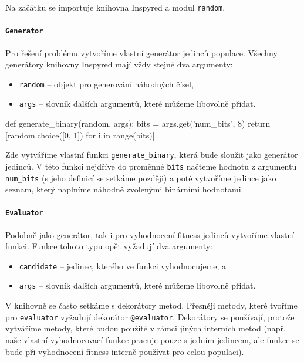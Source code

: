 Na začátku se importuje knihovna Inspyred a modul \texttt{random}.

\paragraph{\texttt{Generator}}
Pro řešení problému vytvoříme vlastní generátor jedinců populace. Všechny
generátory knihovny Inspyred mají vždy stejné dva argumenty:
\begin{itemize}
    \item \texttt{random} -- objekt pro generování náhodných čísel,
    \item \texttt{args} -- slovník dalších argumentů, které můžeme libovolně
        přidat.
\end{itemize}

\begin{code}
def generate_binary(random, args):
    bits = args.get('num_bits', 8)
    return [random.choice([0, 1]) for i in range(bits)]
\end{code}

Zde vytváříme vlastní funkci \texttt{generate\_binary}, která bude sloužit jako
generátor jedinců. V této funkci nejdříve do proměnné \texttt{bits} načteme
hodnotu z argumentu \texttt{num\_bits} (s jeho definicí se setkáme později) a
poté vytvoříme jedince jako seznam, který naplníme náhodně zvolenými binárními
hodnotami.

\paragraph{\texttt{Evaluator}}
Podobně jako generátor, tak i pro vyhodnocení fitness jedinců vytvoříme vlastní
funkci. Funkce tohoto typu opět vyžadují dva argumenty:
\begin{itemize}
    \item \texttt{candidate} -- jedinec, kterého ve funkci vyhodnocujeme, a
    \item \texttt{args} -- slovník dalších argumentů, které můžeme libovolně
        přidat.
\end{itemize}

V knihovně se často setkáme s dekorátory metod. Přesněji metody, které tvoříme
pro \texttt{evaluator} vyžadují dekorátor \texttt{@evaluator}. Dekorátory se
používají, protože vytváříme metody, které budou použité v rámci jiných
interních metod (např. naše vlastní vyhodnocovací funkce pracuje pouze s
jedním jedincem, ale funkce se bude při vyhodnocení fitness interně používat
pro celou populaci).

